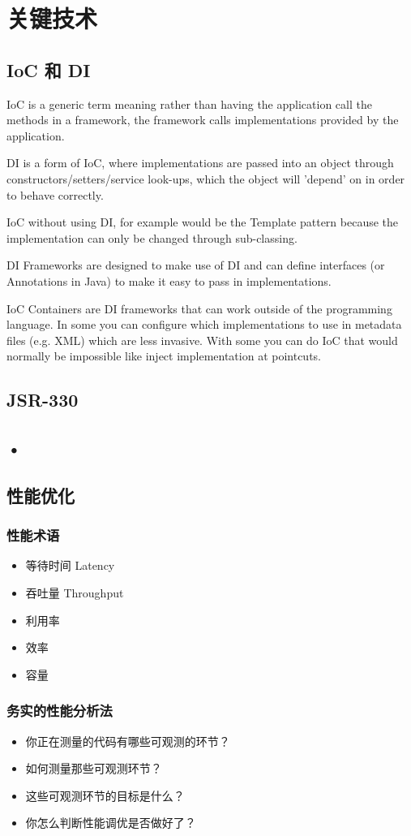 \chapter{关键技术}

\section{IoC 和 DI}

IoC is a generic term meaning rather than having the application call the methods in a framework, the framework calls implementations provided by the application.

DI is a form of IoC, where implementations are passed into an object through constructors/setters/service look-ups, which the object will 'depend' on in order to behave correctly.

IoC without using DI, for example would be the Template pattern because the implementation can only be changed through sub-classing.

DI Frameworks are designed to make use of DI and can define interfaces (or Annotations in Java) to make it easy to pass in implementations.

IoC Containers are DI frameworks that can work outside of the programming language. In some you can configure which implementations to use in metadata files (e.g. XML) which are less invasive. With some you can do IoC that would normally be impossible like inject implementation at pointcuts.

\section{JSR-330}



\section{•}

\section{性能优化}

\subsection{性能术语}

\begin{itemize}
\item 等待时间 Latency
\item 吞吐量 Throughput
\item 利用率
\item 效率
\item 容量

\end{itemize}

\subsection{务实的性能分析法}

\begin{itemize}
\item 你正在测量的代码有哪些可观测的环节？
\item 如何测量那些可观测环节？
\item 这些可观测环节的目标是什么？
\item 你怎么判断性能调优是否做好了？
\end{itemize}